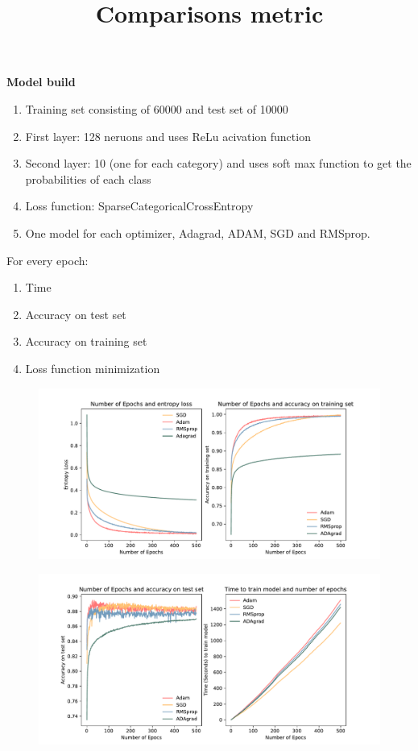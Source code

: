 \documentclass{beamer}
\newcommand\myheading[1]{%
  \par\bigskip
  {\Large\bfseries#1}\par\smallskip}
\begin{document}
\begin{frame}
    \myheading{Model build}
    \begin{enumerate}
        \item{Training set consisting of 60000 and test set of 10000}
        \item First layer: 128 neruons and uses ReLu acivation function
        \item Second layer: 10 (one for each category) and uses soft max function to get the probabilities of each class
        \item Loss function: SparseCategoricalCrossEntropy
        \item One model for each optimizer, Adagrad, ADAM, SGD and RMSprop. 
    \end{enumerate}
\end{frame}

\begin{frame}
    \title{Comparisons metric}
    For every epoch:
    \begin{enumerate}
        \item Time
        \item Accuracy on test set 
        \item Accuracy on training set
        \item Loss function minimization
    \end{enumerate}
\end{frame}


\begin{frame}
    \begin{figure}[h]
        \includegraphics[width=12cm]{report/figures/accuracy_training_and_entropy.pdf}
    \end{figure}
\end{frame}


\begin{frame}
    \begin{figure}[h]
        \includegraphics[width=12cm]{report/figures/time_and_accuracy.pdf}
    \end{figure}
\end{frame}
\end{document}
